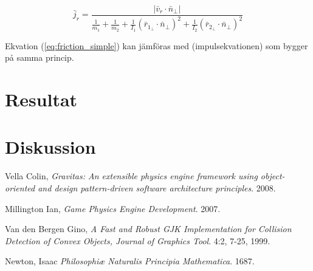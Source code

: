 \documentclass[a4paper,12pt,twopage,swedish]{article}
\begin{document}
\begin{equation}\label{eq:friction_simple}
\bar{j}_r = \frac{|\bar{v}_r \cdot \bar{n}_{\perp}|}{\frac{1}{m_1}+\frac{1}{m_2}+\frac{1}{I_1}(\bar{r}_{1_{\perp}} \cdot \bar{n}_{\perp})^2+\frac{1}{I_2}(\bar{r}_{2_{\perp}} \cdot \bar{n}_{\perp})^2}
\end{equation}

Ekvation (\ref{eq:friction_simple}) kan jämföras med (impulsekvationen) som bygger på samma princip.

\section{Resultat}
\section{Diskussion}
\clearpage
\begin{thebibliography}{9}

  Vella Colin,
  \emph{Gravitas: An extensible physics engine framework using object-oriented and design pattern-driven software architecture principles}.
  2008.

  Millington Ian,
  \emph{Game Physics Engine Development}.
  2007.

  Van den Bergen Gino,
  \emph{A Fast and Robust GJK Implementation for Collision Detection of Convex Objects, Journal of Graphics Tool}.
  4:2, 7-25,
  1999.

  Newton, Isaac
  \emph{Philosophiæ Naturalis Principia Mathematica}.
  1687.

\end{thebibliography}
\end{document}
